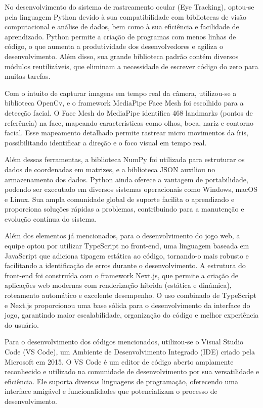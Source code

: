 No desenvolvimento do sistema de rastreamento ocular (Eye Tracking), optou-se pela
linguagem Python devido à sua compatibilidade com bibliotecas de visão computacional e
análise de dados, bem como à sua eficiência e facilidade de aprendizado. Python permite a
criação de programas com menos linhas de código, o que aumenta a produtividade dos
desenvolvedores e agiliza o desenvolvimento. Além disso, sua grande biblioteca padrão
contém diversos módulos reutilizáveis, que eliminam a necessidade de escrever código do
zero para muitas tarefas.

Com o intuito de capturar imagens em tempo real da câmera, utilizou-se a biblioteca OpenCv,
e o framework MediaPipe Face Mesh foi escolhido para a detecção facial. O Face Mesh do
MediaPipe identifica 468 landmarks (pontos de referência) na face, mapeando características
como olhos, boca, nariz e contorno facial. Esse mapeamento detalhado permite rastrear
micro movimentos da íris, possibilitando identificar a direção e o foco visual em tempo real.

Além dessas ferramentas, a biblioteca NumPy foi utilizada para estruturar os dados de
coordenadas em matrizes, e a biblioteca JSON auxiliou no armazenamento dos dados.
Python ainda oferece a vantagem de portabilidade, podendo ser executado em diversos
sistemas operacionais como Windows, macOS e Linux. Sua ampla comunidade global de
suporte facilita o aprendizado e proporciona soluções rápidas a problemas, contribuindo para
a manutenção e evolução contínua do sistema.

Além dos elementos já mencionados, para o desenvolvimento do jogo web, a equipe optou
por utilizar TypeScript no front-end, uma linguagem baseada em JavaScript que adiciona
tipagem estática ao código, tornando-o mais robusto e facilitando a identificação de erros
durante o desenvolvimento. A estrutura do front-end foi construída com o framework Next.js,
que permite a criação de aplicações web modernas com renderização híbrida (estática e
dinâmica), roteamento automático e excelente desempenho. O uso combinado de TypeScript
e Next.js proporcionou uma base sólida para o desenvolvimento da interface do jogo,
garantindo maior escalabilidade, organização do código e melhor experiência do usuário.

Para o desenvolvimento dos códigos mencionados, utilizou-se o Visual Studio Code (VS
Code), um Ambiente de Desenvolvimento Integrado (IDE) criado pela Microsoft em 2015. O
VS Code é um editor de código aberto amplamente reconhecido e utilizado na comunidade
de desenvolvimento por sua versatilidade e eficiência. Ele suporta diversas linguagens de
programação, oferecendo uma interface amigável e funcionalidades que potencializam o
processo de desenvolvimento. \textcite{HanashiroVSCode}


